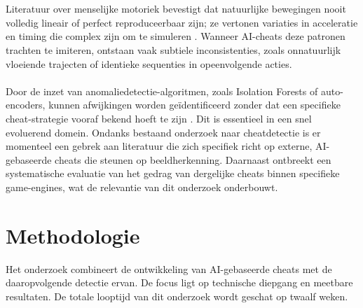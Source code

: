 \\\\
Literatuur over menselijke motoriek bevestigt dat natuurlijke bewegingen nooit volledig lineair of perfect reproduceerbaar zijn; ze vertonen variaties in acceleratie en timing die complex zijn om te simuleren \autocite{VanderKemp2019}. Wanneer AI-cheats deze patronen trachten te imiteren, ontstaan vaak subtiele inconsistenties, zoals onnatuurlijk vloeiende trajecten of identieke sequenties in opeenvolgende acties.
\\\\
Door de inzet van anomaliedetectie-algoritmen, zoals Isolation Forests of auto-encoders, kunnen afwijkingen worden geïdentificeerd zonder dat een specifieke cheat-strategie vooraf bekend hoeft te zijn \autocite{Chen2022}. Dit is essentieel in een snel evoluerend domein. Ondanks bestaand onderzoek naar cheatdetectie is er momenteel een gebrek aan literatuur die zich specifiek richt op externe, AI-gebaseerde cheats die steunen op beeldherkenning. Daarnaast ontbreekt een systematische evaluatie van het gedrag van dergelijke cheats binnen specifieke game-engines, wat de relevantie van dit onderzoek onderbouwt.

\section{Methodologie}%
\label{sec:methodologie}

Het onderzoek combineert de ontwikkeling van AI-gebaseerde cheats met de daaropvolgende detectie ervan. De focus ligt op technische diepgang en meetbare resultaten. De totale looptijd van dit onderzoek wordt geschat op twaalf weken.

